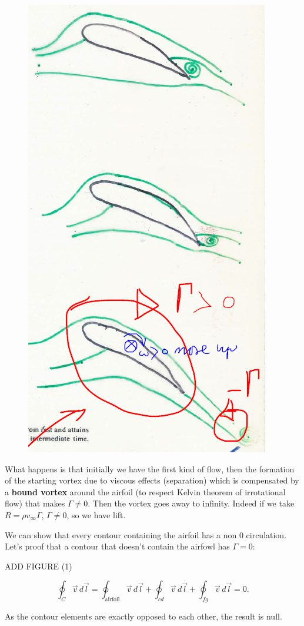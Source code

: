 		\begin{figure}
		\vspace{-5mm}
		\includegraphics[scale=0.35]{ch1/5}
		\end{figure}
		What happens is that initially we have the first kind of flow, then the formation of the starting vortex due to viscous effects (separation) which is compensated by a \textbf{bound vortex} around the airfoil (to respect Kelvin theorem of irrotational flow) that makes $\Gamma \neq 0$. Then the vortex goes away to infinity. Indeed if we take $R = \rho v_\infty \Gamma$, $\Gamma \neq 0$, so we have lift. 
		
		We can show that every contour containing the airfoil has a non 0 circulation. Let's proof that a contour that doesn't contain the airfowl has $\Gamma =0$: 
		
		ADD FIGURE (1)
		
		\begin{equation}
		\oint _{C} \vec{v}\, d\vec{l} = \oint _{\mbox{airfoil}} \vec{v}\, d\vec{l} + \oint _{cd} \vec{v}\, d\vec{l} + \oint _{fg} \vec{v}\, d\vec{l} = 0. 
		\end{equation}
		
		As the contour elements are exactly opposed to each other, the result is null. 